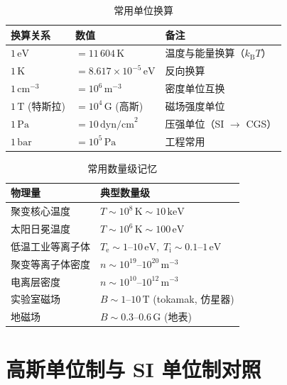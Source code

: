 \documentclass[12pt,a4paper,openany,oneside]{book}
\newcommand{\ii}{\mathrm{i}}
\newcommand{\ee}{\mathrm{e}}
\begin{document}
\begin{table}[htbp]
\centering
\caption{常用单位换算}
\begin{tabular}{@{}lll@{}}
\toprule
\textbf{换算关系} & \textbf{数值} & \textbf{备注} \\
\midrule
$1\,\mathrm{eV}$ & $= 11\,604\,\mathrm{K}$ & 温度与能量换算（$k_\mathrm{B} T$） \\
$1\,\mathrm{K}$ & $= 8.617\times 10^{-5}\,\mathrm{eV}$ & 反向换算 \\
\midrule
$1\,\mathrm{cm}^{-3}$ & $= 10^{6}\,\mathrm{m}^{-3}$ & 密度单位互换 \\
$1\,\mathrm{T}$ (特斯拉) & $= 10^{4}\,\mathrm{G}$ (高斯) & 磁场强度单位 \\
\midrule
$1\,\mathrm{Pa}$ & $= 10\,\mathrm{dyn/cm}^2$ & 压强单位（SI $\to$ CGS） \\
$1\,\mathrm{bar}$ & $= 10^{5}\,\mathrm{Pa}$ & 工程常用 \\
\bottomrule
\end{tabular}
\end{table}

\begin{table}[htbp]
\centering
\caption{常用数量级记忆}
\begin{tabular}{@{}ll@{}}
\toprule
\textbf{物理量} & \textbf{典型数量级} \\
\midrule
聚变核心温度 & $T\sim 10^8\,\mathrm{K}\sim 10\,\mathrm{keV}$ \\
太阳日冕温度 & $T\sim 10^6\,\mathrm{K}\sim 100\,\mathrm{eV}$ \\
低温工业等离子体 & $T_\ee\sim 1\text{--}10\,\mathrm{eV},\; T_\ii\sim 0.1\text{--}1\,\mathrm{eV}$ \\
聚变等离子体密度 & $n\sim 10^{19}\text{--}10^{20}\,\mathrm{m}^{-3}$ \\
电离层密度 & $n\sim 10^{10}\text{--}10^{12}\,\mathrm{m}^{-3}$ \\
实验室磁场 & $B\sim 1\text{--}10\,\mathrm{T}$ (tokamak, 仿星器) \\
地磁场 & $B\sim 0.3\text{--}0.6\,\mathrm{G}$ (地表) \\
\bottomrule
\end{tabular}
\end{table}


\section*{高斯单位制与 SI 单位制对照}
\end{document}
